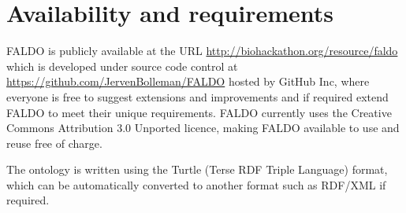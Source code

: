 \section*{Availability and requirements}
FALDO is publicly available at the URL \url{http://biohackathon.org/resource/faldo}
which is developed under source code control at
\url{https://github.com/JervenBolleman/FALDO} hosted by GitHub Inc,
where everyone is free to suggest extensions and improvements and if required extend FALDO to meet their unique requirements.
FALDO currently uses the Creative Commons Attribution 3.0 Unported licence,
making FALDO available to use and reuse free of charge.

The ontology is written using the Turtle (Terse RDF Triple Language) format,
which can be automatically converted to another format such as RDF/XML
if required.


